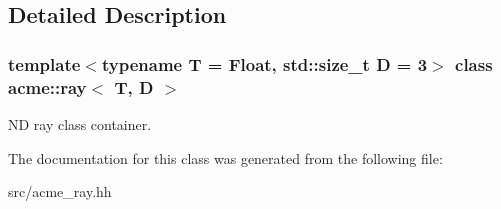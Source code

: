 \subsection{Detailed Description}
\subsubsection*{template$<$typename T = Float, std\+::size\+\_\+t D = 3$>$\newline
class acme\+::ray$<$ T, D $>$}

ND ray class container. 

The documentation for this class was generated from the following file\+:\begin{DoxyCompactItemize}
\item 
src/acme\+\_\+ray.\+hh\end{DoxyCompactItemize}
